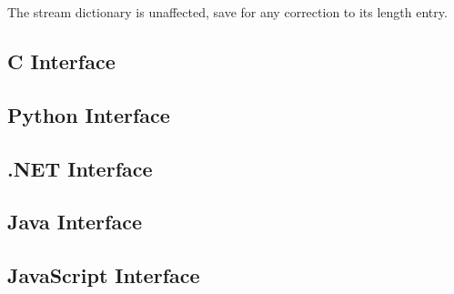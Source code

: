 \documentclass{book}
\begin{document}
\noindent The stream dictionary is unaffected, save for any correction to its length entry.

\begin{cpdflib}
\clearpage
\section*{C Interface}
\begin{small}\tt

\end{small}
\end{cpdflib}

\begin{pycpdflib}
\clearpage
\section*{Python Interface}
\begin{small}\tt

\end{small}
\end{pycpdflib}

\begin{dotnetcpdflib}
\clearpage
\section*{.NET Interface}
\begin{small}\tt

\end{small}
\end{dotnetcpdflib}

\begin{jcpdflib}
\clearpage
\section*{Java Interface}
\begin{small}\tt

\end{small}
\end{jcpdflib}

\begin{jscpdflib}
\clearpage
\section*{JavaScript Interface}
\begin{small}\tt

\end{small}
\end{jscpdflib}
\end{document}
